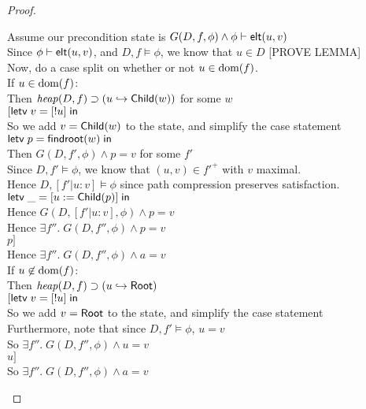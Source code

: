 \begin{proof}
\begin{tabbedproof}
\oo Assume our precondition state is $G(D, f, \phi) \land {\phi} \vdash \mathsf{elt}({u}, {v})$ \\
\ooo Since ${\phi} \vdash \mathsf{elt}({u}, {v})$, and $D,f \models \phi$, we know that $u \in D$ [PROVE LEMMA]\\
\ooo Now, do a case split on whether or not $u \in \mbox{dom}({f})$. \\
\ooo If $u \in \mbox{dom}({f})$: \\
\oooo Then $\mathit{heap}(D,f) \supset (u \hookrightarrow \mathsf{Child}(w))$ for some $w$ \\
\oooo $[\mathsf{letv}\;v = [!u]\;\mathsf{in}\;$ \\
\oooo So we add $v = \mathsf{Child}(w)$ to the state, and simplify the case statement \\
\oooo $\mathsf{letv}\;p = \mathsf{findroot}(w)\;\mathsf{in}\;$ \\
\oooo Then $G(D, f', \phi) \land p = v$ for some $f'$ \\
\oooo Since $D,f' \models \phi$, we know that $(u,v) \in f'^{+}$ with $v$ maximal. \\
\oooo Hence $D,[f'|u:v] \models \phi$ since path compression preserves satisfaction. \\
\oooo $\mathsf{letv}\;\_ = [u := \mathsf{Child}(p)]\;\mathsf{in}\;$ \\
\oooo Hence $G(D, [f'|u:v], \phi) \land p = v$ \\
\oooo Hence $\exists f''.\;G(D, f'', \phi) \land p = v$ \\
\oooo $p]$ \\
\oooo Hence $\exists f''.\;G(D, f'', \phi) \land a = v$ \\
\ooo If $u \not\in \mbox{dom}({f})$:  \\
\oooo Then $\mathit{heap}(D,f) \supset (u \hookrightarrow \mathsf{Root})$  \\
\oooo $[\mathsf{letv}\;v = [!u]\;\mathsf{in}\;$ \\
\oooo So we add $v = \mathsf{Root}$ to the state, and simplify the case statement \\
\oooo Furthermore, note that since $D,f' \models \phi$, $u = v$ \\
\oooo So $\exists f''.\;G(D, f'', \phi) \land u = v$  \\
\oooo $u]$\\
\oooo So $\exists f''.\;G(D, f'', \phi) \land a = v$  \\
\end{tabbedproof}
\end{proof}


